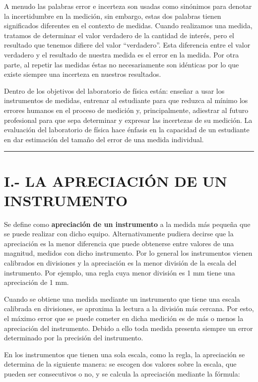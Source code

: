 \documentclass[12pt,a4paper]{article}
\begin{document}
A menudo las palabras error e incerteza son usadas como sinónimos para denotar la incertidumbre en la medición, sin embargo, estas dos palabras tienen significados diferentes en el contexto de medidas. Cuando realizamos una medida, tratamos de determinar el valor verdadero de la cantidad de interés, pero el resultado que tenemos difiere del valor ``verdadero''. Esta diferencia entre el valor verdadero y el resultado de nuestra medida es el error en la medida. Por otra parte, al repetir las medidas éstas no necesariamente son idénticas por lo que existe siempre una incerteza en nuestros resultados.

Dentro de los objetivos del laboratorio de física están: enseñar a usar los instrumentos de medidas, entrenar al estudiante para que reduzca al mínimo los errores humanos en el proceso de medición y, principalmente, adiestrar al futuro profesional para que sepa determinar y expresar las incertezas de su medición. La evaluación del laboratorio de física hace énfasis en la capacidad de un estudiante en dar estimación del tamaño del error de una medida individual.

\vspace{0.5cm}
\hrule
\vspace{0.5cm}

\section{I.- LA APRECIACIÓN DE UN INSTRUMENTO}

Se define como \textbf{apreciación de un instrumento} a la medida más pequeña que se puede realizar con dicho equipo. Alternativamente pudiera decirse que la apreciación es la menor diferencia que puede obtenerse entre valores de una magnitud, medidos con dicho instrumento. Por lo general los instrumentos vienen calibrados en divisiones y la apreciación es la menor división de la escala del instrumento. Por ejemplo, una regla cuya menor división es 1 mm tiene una apreciación de 1 mm.

Cuando se obtiene una medida mediante un instrumento que tiene una escala calibrada en divisiones, se aproxima la lectura a la división más cercana. Por esto, el máximo error que se puede cometer en dicha medición es de más o menos la apreciación del instrumento. Debido a ello toda medida presenta siempre un error determinado por la precisión del instrumento.

En los instrumentos que tienen una sola escala, como la regla, la apreciación se determina de la siguiente manera: se escogen dos valores sobre la escala, que pueden ser consecutivos o no, y se calcula la apreciación mediante la fórmula:
\end{document}
